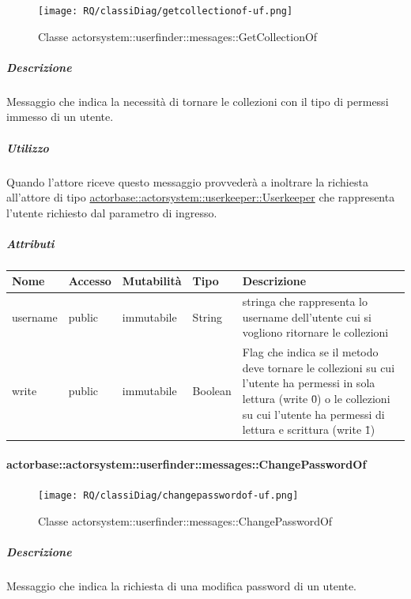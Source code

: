 \documentclass{scalatekids-article}
\begin{document}
\begin{figure}[H]
   \begin{center}
     \texttt{[image: RQ/classiDiag/getcollectionof-uf.png]}
     \caption{Classe actorsystem::userfinder::messages::GetCollectionOf}
   \end{center}
 \end{figure}

\subparagraph{Descrizione}
Messaggio che indica la necessità di tornare le collezioni con il tipo di permessi immesso di un utente.

\subparagraph{Utilizzo}
Quando l'attore riceve questo messaggio provvederà a inoltrare la richiesta all'attore di tipo \hyperref[sec:actorbase::actorsystem::userkeeper::Userkeeper]{actorbase::\allowbreak{}actorsystem::\allowbreak{}userkeeper::\allowbreak{}Userkeeper}
che rappresenta l'utente richiesto dal parametro di ingresso.

\subparagraph{Attributi}
\begin{tabular}{| p{3cm} | p{1.5cm} | p{2cm} | p{2cm} | p{8.5cm} |}
  \hline
  Nome & Accesso & Mutabilità & Tipo & Descrizione\\
  \hline
  username & public & immutabile & String & stringa che rappresenta lo username dell'utente cui si vogliono ritornare le collezioni \\
  \hline
  write & public & immutabile & Boolean & Flag che indica se il metodo deve tornare le collezioni su cui l'utente ha permessi in sola lettura (write \= 0) o le collezioni su cui l'utente ha permessi di lettura e scrittura (write \= 1) \\
  \hline
\end{tabular}

\paragraph{actorbase::actorsystem::userfinder::messages::ChangePasswordOf}
\label{sec:actorbase::actorsystem::userfinder::messages::ChangePasswordOf}

\begin{figure}[H]
   \begin{center}
     \texttt{[image: RQ/classiDiag/changepasswordof-uf.png]}
     \caption{Classe actorsystem::userfinder::messages::ChangePasswordOf}
   \end{center}
 \end{figure}

\subparagraph{Descrizione}
Messaggio che indica la richiesta di una modifica password di un utente.
\end{document}
